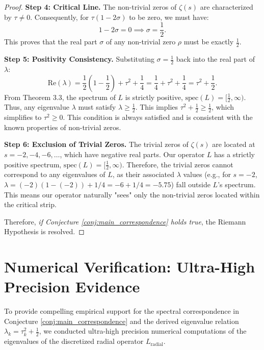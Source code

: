 \documentclass[12pt]{article}
\begin{document}
\begin{proof}
\textbf{Step 4: Critical Line.} The non-trivial zeros of $\zeta(s)$ are characterized by $\tau \neq 0$. Consequently, for $\tau(1-2\sigma)$ to be zero, we must have:
\begin{equation*}
1 - 2\sigma = 0 \implies \sigma = \frac{1}{2}.
\end{equation*}
This proves that the real part $\sigma$ of any non-trivial zero $\rho$ must be exactly $\frac{1}{2}$.

\textbf{Step 5: Positivity Consistency.} Substituting $\sigma = \frac{1}{2}$ back into the real part of $\lambda$:
\begin{equation*}
\text{Re}(\lambda) = \frac{1}{2}(1-\frac{1}{2}) + \tau^2 + \frac{1}{4} = \frac{1}{4} + \tau^2 + \frac{1}{4} = \tau^2 + \frac{1}{2}.
\end{equation*}
From Theorem 3.3, the spectrum of $L$ is strictly positive, $\text{spec}(L) = [\frac{1}{2}, \infty)$. Thus, any eigenvalue $\lambda$ must satisfy $\lambda \geq \frac{1}{2}$. This implies $\tau^2 + \frac{1}{2} \geq \frac{1}{2}$, which simplifies to $\tau^2 \geq 0$. This condition is always satisfied and is consistent with the known properties of non-trivial zeros.

\textbf{Step 6: Exclusion of Trivial Zeros.} The trivial zeros of $\zeta(s)$ are located at $s = -2, -4, -6, \dots$, which have negative real parts. Our operator $L$ has a strictly positive spectrum, $\text{spec}(L) = [\frac{1}{2}, \infty)$. Therefore, the trivial zeros cannot correspond to any eigenvalues of $L$, as their associated $\lambda$ values (e.g., for $s=-2$, $\lambda = (-2)(1-(-2)) + 1/4 = -6 + 1/4 = -5.75$) fall outside $L$'s spectrum. This means our operator naturally "sees" only the non-trivial zeros located within the critical strip.

Therefore, \textit{if Conjecture \ref{conj:main_correspondence} holds true}, the Riemann Hypothesis is resolved.
\end{proof}

\section{Numerical Verification: Ultra-High Precision Evidence}

To provide compelling empirical support for the spectral correspondence in Conjecture \ref{conj:main_correspondence} and the derived eigenvalue relation $\lambda_k = \tau_k^2 + \frac{1}{2}$, we conducted ultra-high precision numerical computations of the eigenvalues of the discretized radial operator $L_{\text{radial}}$.
\end{document}
